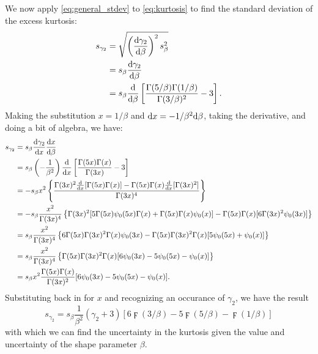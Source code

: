 We now apply \eqref{eq:general_stdev} to \eqref{eq:kurtosis} to find the standard deviation of the excess kurtosis:
\begin{align} \label{eq:kurt_err_partial1}
	s_{\gamma_{2}} &= \sqrt{ \left( \frac{{\rm {d}} \gamma_{2}}{{\rm {d}} \beta} \right)^{2} s_{\beta}^{2} } \\
		&= s_{\beta} \frac{{\rm {d}} \gamma_{2}}{{\rm {d}} \beta} \\
		&= s_{\beta} \frac{{\rm {d}}}{{\rm {d}} \beta} \left[ \frac{\Gamma(5/\beta) \Gamma(1/\beta)}{\Gamma(3/\beta)^{2}} - 3 \right].
\end{align}
Making the substitution $x = 1 / \beta$ and ${\rm {d}} x = - 1 / \beta^{2} {\rm {d}} \beta$, taking the derivative, and doing a bit of algebra, we have:
\begin{align} \label{eq:kurt_err_partial2}
	s_{\gamma_{2}} &= s_{\beta} \frac{{\rm {d}} \gamma_{2}}{{\rm {d}} x} \frac{{\rm {d}} x}{{\rm {d}} \beta} \\
		&= s_{\beta} \left( -\frac{1}{\beta^{2}} \right) \frac{{\rm {d}}}{{\rm {d}} x} \left[ \frac{\Gamma(5x) \Gamma(x)}{\Gamma(3x)} - 3 \right] \\
		&= -s_{\beta} x^{2} \left\{ \frac{\Gamma(3x)^{2} \frac{{\rm {d}}}{{\rm {d}} x} [\Gamma(5x) \Gamma(x)] - \Gamma(5x) \Gamma(x) \frac{{\rm {d}}}{{\rm {d}} x} [\Gamma(3x)^{2}]}{\Gamma(3x)^{4}} \right\} \\
		&= -s_{\beta} \frac{x^{2}}{\Gamma(3x)^{4}} \left\{ \Gamma(3x)^{2} [5\Gamma(5x) {\psi_{0}}(5x) \Gamma(x) + \Gamma(5x) \Gamma(x) {\psi_{0}}(x)] - \Gamma(5x) \Gamma(x) [6\Gamma(3x)^{2} {\psi_{0}}(3x)] \right\} \\
		&= s_{\beta} \frac{x^{2}}{\Gamma(3x)^{4}} \left\{ 6\Gamma(5x) \Gamma(3x)^{2} \Gamma(x) {\psi_{0}}(3x) - \Gamma(5x) \Gamma(3x)^{2} \Gamma(x) [5{\psi_{0}}(5x) + {\psi_{0}}(x)] \right\} \\
		&= s_{\beta} \frac{x^{2}}{\Gamma(3x)^{4}} \left\{ \Gamma(5x) \Gamma(3x)^{2} \Gamma(x) [6{\psi_{0}}(3x) - 5{\psi_{0}}(5x) - {\psi_{0}}(x)] \right\} \\
		&= s_{\beta} x^{2} \frac{\Gamma(5x) \Gamma(x)}{\Gamma(3x)^{2}} [6{\psi_{0}}(3x) - 5{\psi_{0}}(5x) - {\psi_{0}}(x)].
\end{align}
Substituting back in for $x$ and recognizing an occurance of $\gamma_{2}$, we have the result
\begin{equation} \label{eq:kurt_err}
	s_{\gamma_{2}} = s_{\beta} \frac{1}{\beta^{2}} \left( \gamma_{2} + 3 \right) \left[ 6 \digamma(3/\beta) - 5 \digamma(5/\beta) - \digamma(1/\beta) \right]
\end{equation}
with which we can find the uncertainty in the kurtosis given the value and uncertainty of the shape parameter $\beta$.

